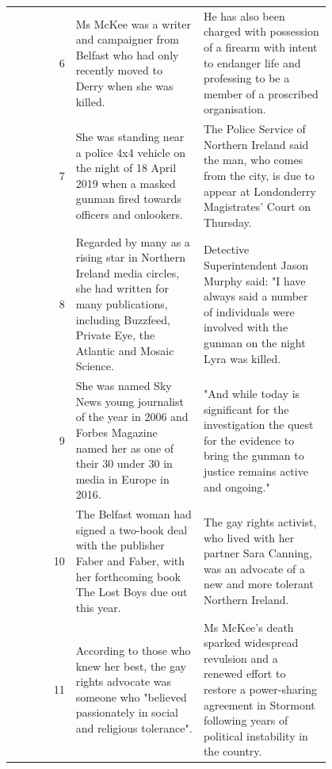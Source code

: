 \begin{table}[!htbp]
\begin{tabular}{r | p{0.4\linewidth} | p{0.4\linewidth} }
        6\vspace{-2px} & \tiny{Ms McKee was a writer and campaigner from Belfast who had only recently moved to Derry when she was killed.}\vspace{-2px}& \tiny{He has also been charged with possession of a firearm with intent to endanger life and professing to be a member of a proscribed organisation.}\vspace{-2px}\\
        7\vspace{-2px} & \tiny{She was standing near a police 4x4 vehicle on the night of 18 April 2019 when a masked gunman fired towards officers and onlookers.}\vspace{-2px} & \tiny{The Police Service of Northern Ireland said the man, who comes from the city, is due to appear at Londonderry Magistrates' Court on Thursday.}\vspace{-2px} \\
        8\vspace{-2px} & \tiny{Regarded by many as a rising star in Northern Ireland media circles, she had written for many publications, including Buzzfeed, Private Eye, the Atlantic and Mosaic Science.}\vspace{-2px} & \tiny{Detective Superintendent Jason Murphy said: "I have always said a number of individuals were involved with the gunman on the night Lyra was killed.}\vspace{-2px} \\
        9\vspace{-2px} & \tiny{She was named Sky News young journalist of the year in 2006 and Forbes Magazine named her as one of their 30 under 30 in media in Europe in 2016.}\vspace{-2px} & \tiny{"And while today is significant for the investigation the quest for the evidence to bring the gunman to justice remains active and ongoing."}\vspace{-2px} \\
        10\vspace{-2px} & \tiny{The Belfast woman had signed a two-book deal with the publisher Faber and Faber, with her forthcoming book The Lost Boys due out this year.}\vspace{-2px} & \tiny{The gay rights activist, who lived with her partner Sara Canning, was an advocate of a new and more tolerant Northern Ireland.}\vspace{-2px} \\
        11\vspace{-2px} & \tiny{According to those who knew her best, the gay rights advocate was someone who "believed passionately in social and religious tolerance".}\vspace{-2px} & \tiny{Ms McKee's death sparked widespread revulsion and a renewed effort to restore a power-sharing agreement in Stormont following years of political instability in the country.}\vspace{-2px} \\

\end{tabular}
\end{table}
